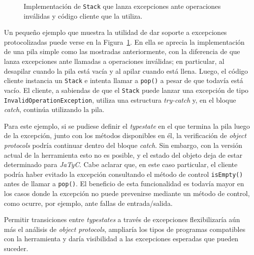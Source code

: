 \begin{figure}[htbp]
    \centering
    
    \vspace{0.3cm}
    
    \caption{Implementación de \texttt{Stack} que lanza excepciones ante operaciones inválidas y código cliente que la utiliza.}
    \label{exp:exception-stack}
\end{figure}

Un pequeño ejemplo que muestra la utilidad de dar soporte a excepciones protocolizadas puede verse en la Figura~\ref{exp:exception-stack}. En ella se aprecia la implementación de una pila simple como las mostradas anteriormente, con la diferencia de que lanza excepciones ante llamadas a operaciones inválidas; en particular, al desapilar cuando la pila está vacía y al apilar cuando está llena. Luego, el código cliente instancia un \texttt{Stack} e intenta llamar a \texttt{pop()} a pesar de que todavía está vacío. El cliente, a sabiendas de que el \texttt{Stack} puede lanzar una excepción de tipo \texttt{InvalidOperationException}, utiliza una estructura \textit{try-catch} y, en el bloque \textit{catch}, continúa utilizando la pila.

Para este ejemplo, si se pudiese definir el \textit{typestate} en el que termina la pila luego de la excepción, junto con los métodos disponibles en él, la verificación de \textit{object protocols} podría continuar dentro del bloque \textit{catch}. Sin embargo, con la versión actual de la herramienta esto no es posible, y el estado del objeto deja de estar determinado para \textit{JaTyC}. Cabe aclarar que, en este caso particular, el cliente podría haber evitado la excepción consultando el método de control \texttt{isEmpty()} antes de llamar a \texttt{pop()}. El beneficio de esta funcionalidad es todavía mayor en los casos donde la excepción no puede prevenirse mediante un método de control, como ocurre, por ejemplo, ante fallas de entrada/salida.

Permitir transiciones entre \textit{typestates} a través de excepciones flexibilizaría aún más el análisis de \textit{object protocols}, ampliaría los tipos de programas compatibles con la herramienta y daría visibilidad a las excepciones esperadas que pueden suceder.
